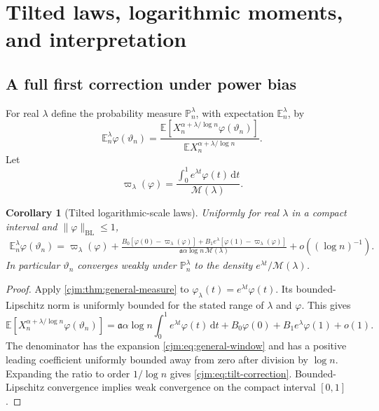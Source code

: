 \documentclass[11pt,a4paper]{article}
\newtheorem{corollary}[corollary]{Corollary}
\theoremstyle{definition}\newaliascnt{definition}{theorem}
\theoremstyle{remark}\newaliascnt{remark}{theorem}
\newcommand{\dd}{\mathrm d}
\newcommand{\ljP}{\mathbb P}
\newcommand{\ljE}{\mathbb E}
\newcommand{\cjBL}{\mathrm{BL}}
\begin{document}
\section{Tilted laws, logarithmic moments, and interpretation}
\label{cjm:sec:tilts}

\subsection{A full first correction under power bias}
For real $\lambda$ define the probability measure $\ljP^\lambda_n$, with
expectation $\ljE^\lambda_n$, by
\begin{equation}
 \ljE^\lambda_n\varphi(\vartheta_n)
 =\frac{\ljE[X_n^{\alpha+\lambda/\log n}\varphi(\vartheta_n)]}
        {\ljE X_n^{\alpha+\lambda/\log n}}.
 \label{cjm:eq:Q}
\end{equation}
Let
\[
 \varpi_\lambda(\varphi)
 =\frac{\int_0^1e^{\lambda t}\varphi(t)\,\dd t}{\mathcal M(\lambda)}.
\]

\begin{corollary}[Tilted logarithmic-scale laws]
\label{cjm:cor:tilt}
Uniformly for real $\lambda$ in a compact interval and
$\|\varphi\|_{\cjBL}\le1$,
\begin{align}
 \ljE^\lambda_n\varphi(\vartheta_n)=\varpi_\lambda(\varphi)
 +\frac{B_0[\varphi(0)-\varpi_\lambda(\varphi)]
       +B_1e^\lambda[\varphi(1)-\varpi_\lambda(\varphi)]}
       {\mathfrak a\alpha\log n\,\mathcal M(\lambda)}
 +o((\log n)^{-1}).
 \label{cjm:eq:tilt-correction}
\end{align}
In particular $\vartheta_n$ converges weakly under $\ljP^\lambda_n$ to the
density $e^{\lambda t}/\mathcal M(\lambda)$.
\end{corollary}
\begin{proof}
Apply \cref{cjm:thm:general-measure} to
$\varphi_\lambda(t)=e^{\lambda t}\varphi(t)$. Its bounded-Lipschitz norm is
uniformly bounded for the stated range of $\lambda$ and $\varphi$. This gives
\[
 \ljE[X_n^{\alpha+\lambda/\log n}\varphi(\vartheta_n)]
 =\mathfrak a\alpha\log n\int_0^1e^{\lambda t}\varphi(t)\,\dd t
   +B_0\varphi(0)+B_1e^\lambda\varphi(1)+o(1).
\]
The denominator has the expansion \eqref{cjm:eq:general-window} and has a
positive leading coefficient uniformly bounded away from zero after
division by $\log n$. Expanding the ratio to order $1/\log n$ gives
\eqref{cjm:eq:tilt-correction}. Bounded-Lipschitz convergence implies weak
convergence on the compact interval $[0,1]$.
\end{proof}
\end{document}
